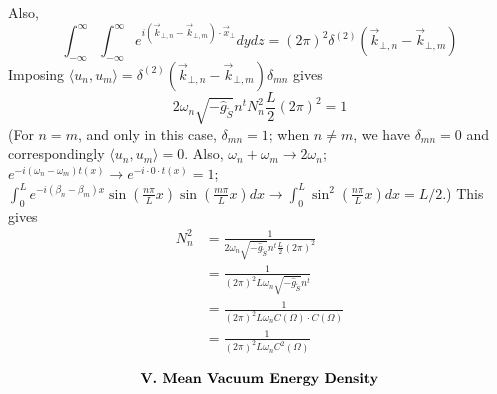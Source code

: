 \documentclass[english]{article}
\begin{document}
Also, 
\[
\int^{\infty}_{-\infty}\int^{\infty}_{-\infty}e^{i\left(\vec{k}_{\bot,n}-\vec{k}_{\bot,m}\right)\cdot\vec{x}_{\bot}}dydz=\left(2\pi\right)^{2}\delta^{(2)}\left(\vec{k}_{\bot,n}-\vec{k}_{\bot,m}\right)
\]
 Imposing $\langle u_{n},u_{m}\rangle=\delta^{(2)}\left(\vec{k}_{\bot,n}-\vec{k}_{\bot,m}\right)\delta_{mn}$
gives 
\[
2\omega_{n}\sqrt{-\hat{g}_{\tilde{S}}}n^{t}N^{2}_{n}\frac{L}{2}\left(2\pi\right)^{2}=1
\]
 (For $n=m$, and only in this case, $\delta_{mn}=1$; when $n\neq m$,
we have $\delta_{mn}=0$ and correspondingly $\langle u_{n},u_{m}\rangle=0$.
Also, $\omega_{n}+\omega_{m}\rightarrow2\omega_{n}$; $e^{-i\left(\omega_{n}-\omega_{m}\right)t(x)}\rightarrow e^{-i\cdot0\cdot t(x)}=1$;
$\int^{L}_{0}e^{-i\left(\beta_{n}-\beta_{m}\right)x}\sin\left(\frac{n\pi}{L}x\right)\sin\left(\frac{m\pi}{L}x\right)dx\rightarrow\int^{L}_{0}\sin^{2}\left(\frac{n\pi}{L}x\right)dx=L/2$.)
This gives 
\begin{align*}
N^{2}_{n} & =\frac{1}{2\omega_{n}\sqrt{-\hat{g}_{\tilde{S}}}n^{t}\frac{L}{2}\left(2\pi\right)^{2}}\\
 & =\frac{1}{\left(2\pi\right)^{2}L\omega_{n}\sqrt{-\hat{g}_{\tilde{S}}}n^{t}}\\
 & =\frac{1}{\left(2\pi\right)^{2}L\omega_{n}C\left(\Omega\right)\cdot C\left(\Omega\right)}\\
 & =\frac{1}{\left(2\pi\right)^{2}L\omega_{n}C^{2}\left(\Omega\right)}
\end{align*}

\Needspace{110pt}\par\addvspace{20pt}\noindent\begin{minipage}{\linewidth}\begingroup\fontsize{12}{15}\selectfont\setlength{\abovedisplayskip}{0pt}\setlength{\belowdisplayskip}{0pt}\setlength{\abovedisplayshortskip}{0pt}\setlength{\belowdisplayshortskip}{0pt}
\[
\text{\bfseries V. Mean Vacuum Energy Density}
\]
\endgroup\end{minipage}\par\nopagebreak[4]\vspace{20pt}\nopagebreak[4]
\end{document}
